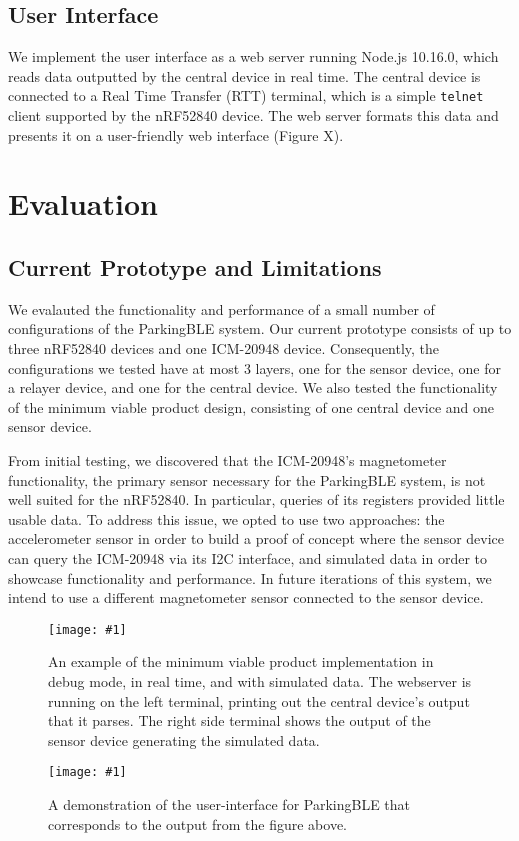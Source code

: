 \documentclass[sigconf]{acmart}
\def\mediumcolfig#1{\texttt{[image: \#1]}}
\def\colfig#1{\texttt{[image: \#1]}}
\begin{document}
\subsection{User Interface}
We implement the user interface as a web server running Node.js 10.16.0,
which reads data outputted by the central device in real time. The central
device is connected to a Real Time Transfer (RTT) terminal, which is a simple
\verb.telnet. client supported by the nRF52840 device. The web server formats this
data and presents it on a user-friendly web interface (Figure X).

\section{Evaluation}

\subsection{Current Prototype and Limitations}
We evalauted the functionality and performance of a small number of
configurations of the ParkingBLE system. Our current prototype consists
of up to three nRF52840 devices and one ICM-20948 device. Consequently,
the configurations we tested have at most 3 layers, one for the
sensor device, one for a relayer device, and one for the central device.
We also tested the functionality of the minimum viable product design,
consisting of one central device and one sensor device. \newline

From initial testing, we discovered that the ICM-20948's magnetometer
functionality, the primary sensor necessary for the ParkingBLE system,
is not well suited for the nRF52840. In particular, queries of its
registers provided little usable data. To address this issue, we opted
to use two approaches: the accelerometer sensor in order to build a
proof of concept where the sensor device can query the ICM-20948 via
its I2C interface, and simulated data in order to showcase functionality
and performance. In future iterations of this system, we intend to
use a different magnetometer sensor connected to the sensor device.

\begin{figure}
  \centerline{\colfig{figs/terminal.pdf}}
    \caption{An example of the minimum viable product implementation in
    debug mode, in real time, and with simulated data. The webserver is
    running on the left terminal, printing out the central device's output
    that it parses. The right side terminal shows the output of the sensor
    device generating the simulated data.}
    \label{fig:webserver}
  \centerline{\mediumcolfig{figs/webserver.pdf}}
    \caption{A demonstration of the user-interface for ParkingBLE that
    corresponds to the output from the figure above.}
    \label{fig:webserver}
\end{figure}
\end{document}
